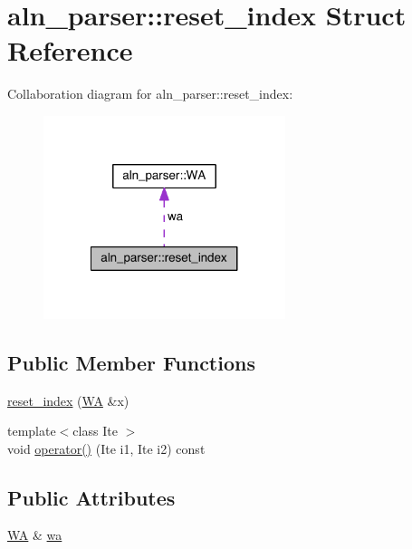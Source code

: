 \hypertarget{structaln__parser_1_1reset__index}{\section{aln\+\_\+parser\+:\+:reset\+\_\+index Struct Reference}
\label{structaln__parser_1_1reset__index}
}


Collaboration diagram for aln\+\_\+parser\+:\+:reset\+\_\+index\+:
\nopagebreak
\begin{figure}[H]
\begin{center}
\leavevmode
\includegraphics[width=200pt]{structaln__parser_1_1reset__index__coll__graph}
\end{center}
\end{figure}
\subsection*{Public Member Functions}
\begin{DoxyCompactItemize}
\item 
\hyperlink{structaln__parser_1_1reset__index_ae29532835fc6f227ce2797a23f9ef52a}{reset\+\_\+index} (\hyperlink{structaln__parser_1_1_w_a}{W\+A} \&x)
\item 
{\footnotesize template$<$class Ite $>$ }\\void \hyperlink{structaln__parser_1_1reset__index_afa5c1d6918fbd4b90bbdda057b6a5f76}{operator()} (Ite i1, Ite i2) const 
\end{DoxyCompactItemize}
\subsection*{Public Attributes}
\begin{DoxyCompactItemize}
\item 
\hyperlink{structaln__parser_1_1_w_a}{W\+A} \& \hyperlink{structaln__parser_1_1reset__index_a9b302b2528d6aa1aedb06ebd572f88e4}{wa}
\end{DoxyCompactItemize}


